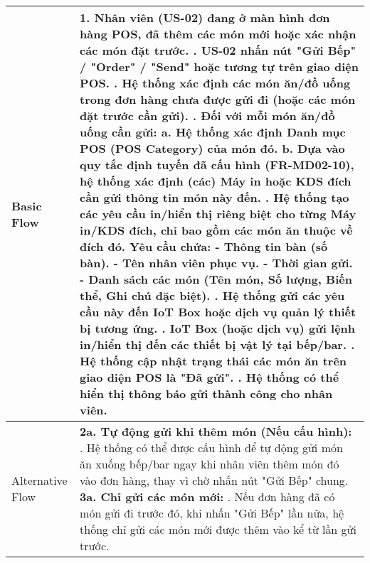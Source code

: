 \begin{longtable}{|m{4cm}|p{11cm}|}
Basic Flow & 1. Nhân viên (US-02) đang ở màn hình đơn hàng POS, đã thêm các món mới hoặc xác nhận các món đặt trước. \newline 2. US-02 nhấn nút "Gửi Bếp" / "Order" / "Send" hoặc tương tự trên giao diện POS. \newline 3. Hệ thống xác định các món ăn/đồ uống trong đơn hàng chưa được gửi đi (hoặc các món đặt trước cần gửi). \newline 4. Đối với mỗi món ăn/đồ uống cần gửi: \newline    a. Hệ thống xác định Danh mục POS (POS Category) của món đó. \newline    b. Dựa vào quy tắc định tuyến đã cấu hình (FR-MD02-10), hệ thống xác định (các) Máy in hoặc KDS đích cần gửi thông tin món này đến. \newline 5. Hệ thống tạo các yêu cầu in/hiển thị riêng biệt cho từng Máy in/KDS đích, chỉ bao gồm các món ăn thuộc về đích đó. Yêu cầu chứa: \newline    - Thông tin bàn (số bàn). \newline    - Tên nhân viên phục vụ. \newline    - Thời gian gửi. \newline    - Danh sách các món (Tên món, Số lượng, Biến thể, Ghi chú đặc biệt). \newline 6. Hệ thống gửi các yêu cầu này đến IoT Box hoặc dịch vụ quản lý thiết bị tương ứng. \newline 7. IoT Box (hoặc dịch vụ) gửi lệnh in/hiển thị đến các thiết bị vật lý tại bếp/bar. \newline 8. Hệ thống cập nhật trạng thái các món ăn trên giao diện POS là "Đã gửi". \newline 9. Hệ thống có thể hiển thị thông báo gửi thành công cho nhân viên. \\
\hline
Alternative Flow & \textbf{2a. Tự động gửi khi thêm món (Nếu cấu hình):} \newline    1. Hệ thống có thể được cấu hình để tự động gửi món ăn xuống bếp/bar ngay khi nhân viên thêm món đó vào đơn hàng, thay vì chờ nhấn nút "Gửi Bếp" chung. \newline \textbf{3a. Chỉ gửi các món mới:} \newline    1. Nếu đơn hàng đã có món gửi đi trước đó, khi nhấn "Gửi Bếp" lần nữa, hệ thống chỉ gửi các món mới được thêm vào kể từ lần gửi trước. \\
\hline

\end{longtable}
